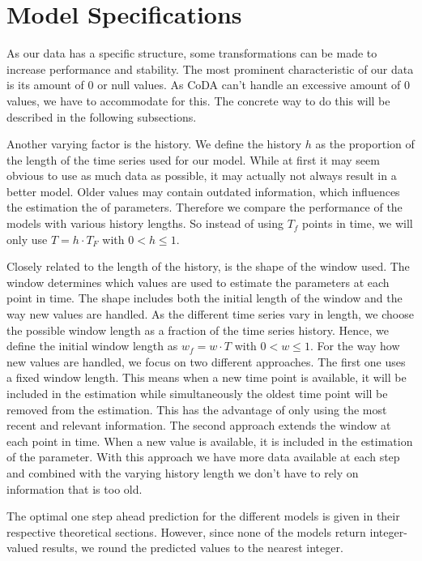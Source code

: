 \section{Model Specifications}
\label{sec: Model Specification}

As our data has a specific structure, some transformations can be made to increase performance and stability. The most prominent characteristic of our data is its amount of 0 or null values. As CoDA can't handle an excessive amount of 0 values, we have to accommodate for this. The concrete way to do this will be described in the following subsections. 

Another varying factor is the history. We define the history $h$ as the proportion of the length of the time series used for our model. While at first it may seem obvious to use as much data as possible, it may actually not always result in a better model. Older values may contain outdated information, which influences the estimation the of parameters. Therefore we compare the performance of the models with various history lengths. So instead of using $T_f$ points in time, we will only use $T=h\cdot T_F$ with $0 < h \leq 1$. 

Closely related to the length of the history, is the shape of the window used. The window determines which values are used to estimate the parameters at each point in time. The shape includes both the initial length of the window and the way new values are handled. As the different time series vary in length, we choose the possible window length as a fraction of the time series history. Hence, we define the initial window length as $w_f=w \cdot T$ with $0 < w \leq 1$. For the way how new values are handled, we focus on two different approaches. The first one uses a fixed window length. This means when a new time point is available, it will be included in the estimation while simultaneously the oldest time point will be removed from the estimation. This has the advantage of only using the most recent and relevant information. The second approach extends the window at each point in time. When a new value is available, it is included in the estimation of the parameter. With this approach we have more data available at each step and combined with the varying history length we don't have to rely on information that is too old.

The optimal one step ahead prediction for the different models is given in their respective theoretical sections. However, since none of the models return integer-valued results, we round the predicted values to the nearest integer. 

